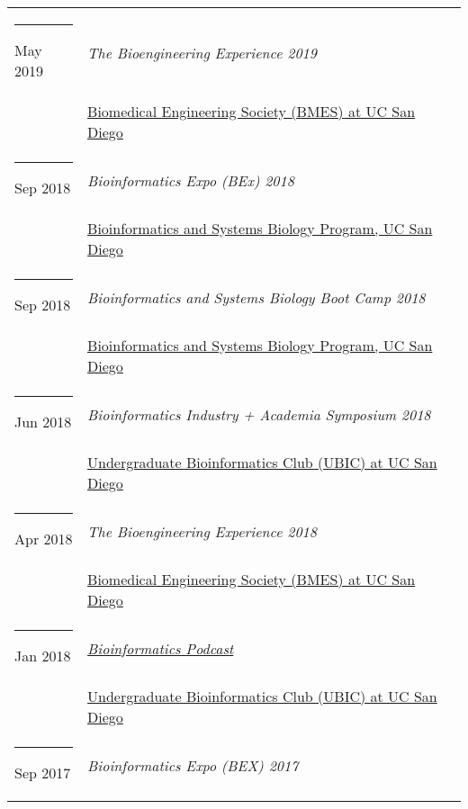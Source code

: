 \documentclass[margin,line]{res}
\begin{document}
\begin{resume}
\begin{longtable}{@{}p{0.7in}p{4in}}
\hspace*{-4mm} \rule{-1mm}{5mm} May 2019 & \textit{The Bioengineering Experience 2019}\\*
\hspace*{-4mm} & \hspace{4mm} \href{http://bmes.ucsd.edu/}{Biomedical Engineering Society (BMES) at UC San Diego}\\
\hspace*{-4mm} \rule{-1mm}{5mm} Sep 2018 & \textit{Bioinformatics Expo (BEx) 2018}\\*
\hspace*{-4mm} & \hspace{4mm} \href{http://bioinformatics.ucsd.edu/}{Bioinformatics and Systems Biology Program, UC San Diego}\\
\hspace*{-4mm} \rule{-1mm}{5mm} Sep 2018 & \textit{Bioinformatics and Systems Biology Boot Camp 2018}\\*
\hspace*{-4mm} & \hspace{4mm} \href{http://bioinformatics.ucsd.edu/}{Bioinformatics and Systems Biology Program, UC San Diego}\\
\hspace*{-4mm} \rule{-1mm}{5mm} Jun 2018 & \textit{Bioinformatics Industry + Academia Symposium 2018}\\*
\hspace*{-4mm} & \hspace{4mm} \href{http://ubicucsd.github.io/}{Undergraduate Bioinformatics Club (UBIC) at UC San Diego}\\
\hspace*{-4mm} \rule{-1mm}{5mm} Apr 2018 & \textit{The Bioengineering Experience 2018}\\*
\hspace*{-4mm} & \hspace{4mm} \href{http://bmes.ucsd.edu/}{Biomedical Engineering Society (BMES) at UC San Diego}\\
\hspace*{-4mm} \rule{-1mm}{5mm} Jan 2018 & \href{https://soundcloud.com/ubicucsd/ubic-podcast-episode-1}{\textit{Bioinformatics Podcast}}\\*
\hspace*{-4mm} & \hspace{4mm} \href{http://ubicucsd.github.io/}{Undergraduate Bioinformatics Club (UBIC) at UC San Diego}\\
\hspace*{-4mm} \rule{-1mm}{5mm} Sep 2017 & \textit{Bioinformatics Expo (BEX) 2017}\\*

\end{longtable}
\end{resume}
\end{document}
